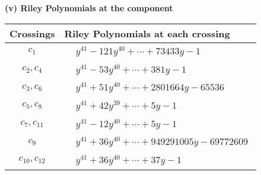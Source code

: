 \documentclass[1p]{elsarticle_modified}
\theoremstyle{definition}
\begin{document}
\newpage\renewcommand{\arraystretch}{1}
\flushleft \textbf{(v) Riley Polynomials at the component}\newline \\
\begin{tabular}{m{50pt}|m{274pt}}
Crossings & \hspace{64pt}Riley Polynomials at each crossing \\
\hline $$\begin{aligned}c_{1}\end{aligned}$$&$\begin{aligned}
&y^{41}-121 y^{40}+\cdots+73433 y-1
\end{aligned}$\\
\hline $$\begin{aligned}c_{2},c_{4}\end{aligned}$$&$\begin{aligned}
&y^{41}-53 y^{40}+\cdots+381 y-1
\end{aligned}$\\
\hline $$\begin{aligned}c_{3},c_{6}\end{aligned}$$&$\begin{aligned}
&y^{41}+51 y^{40}+\cdots+2801664 y-65536
\end{aligned}$\\
\hline $$\begin{aligned}c_{5},c_{8}\end{aligned}$$&$\begin{aligned}
&y^{41}+42 y^{39}+\cdots+5 y-1
\end{aligned}$\\
\hline $$\begin{aligned}c_{7},c_{11}\end{aligned}$$&$\begin{aligned}
&y^{41}-12 y^{40}+\cdots+5 y-1
\end{aligned}$\\
\hline $$\begin{aligned}c_{9}\end{aligned}$$&$\begin{aligned}
&y^{41}+36 y^{40}+\cdots+949291005 y-69772609
\end{aligned}$\\
\hline $$\begin{aligned}c_{10},c_{12}\end{aligned}$$&$\begin{aligned}
&y^{41}+36 y^{40}+\cdots+37 y-1
\end{aligned}$\\
\hline
\end{tabular}\\~\\
\end{document}
